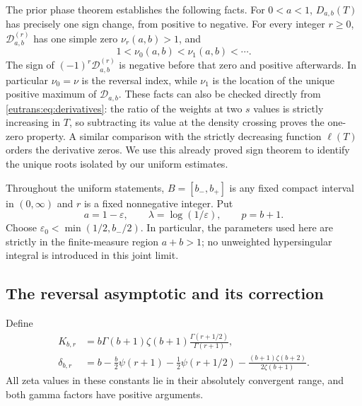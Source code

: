 The prior phase theorem \cite{RepoEuler} establishes the following facts. For $0<a<1$,
$D_{a,b}(T)$ has precisely one sign change, from positive to negative.
For every integer $r\geq0$, $\mathcal D_{a,b}^{(r)}$ has one simple
zero $\nu_r(a,b)>1$, and
\[
 1<\nu_0(a,b)<\nu_1(a,b)<\cdots.
\]
The sign of $(-1)^r\mathcal D_{a,b}^{(r)}$ is negative before that
zero and positive afterwards. In particular $\nu_0=\nu$ is the
reversal index, while $\nu_1$ is the location of the unique positive
maximum of $\mathcal D_{a,b}$. These facts can also be checked directly from
\eqref{eutrans:eq:derivatives}: the ratio of the weights at two $s$
values is strictly increasing in $T$, so subtracting its value at the
density crossing proves the one-zero property. A similar comparison
with the strictly decreasing function $\ell(T)$ orders the derivative
zeros. We use this already proved sign theorem to identify the unique
roots isolated by our uniform estimates.

Throughout the uniform statements, $B=[b_-,b_+]$ is any fixed compact
interval in $(0,\infty)$ and $r$ is a fixed nonnegative integer. Put
\[
 a=1-\varepsilon,\qquad
 \lambda=\log(1/\varepsilon),\qquad p=b+1.
\]
Choose $\varepsilon_0<\min(1/2,b_-/2)$. In particular, the parameters
used here are strictly in the finite-measure region $a+b>1$; no
unweighted hypersingular integral is introduced in this joint limit.

\subsection{The reversal asymptotic and its correction}

Define
\begin{align}
 K_{b,r}&=b\Gamma(b+1)\zeta(b+1)
              \frac{\Gamma(r+1/2)}{\Gamma(r+1)},
 \label{eutrans:eq:K}\\
 \delta_{b,r}&=b-\frac b2\psi(r+1)-\frac12\psi(r+1/2)
      -\frac{(b+1)\zeta(b+2)}{2\zeta(b+1)}.
 \label{eutrans:eq:delta}
\end{align}
All zeta values in these constants lie in their absolutely convergent
range, and both gamma factors have positive arguments.


